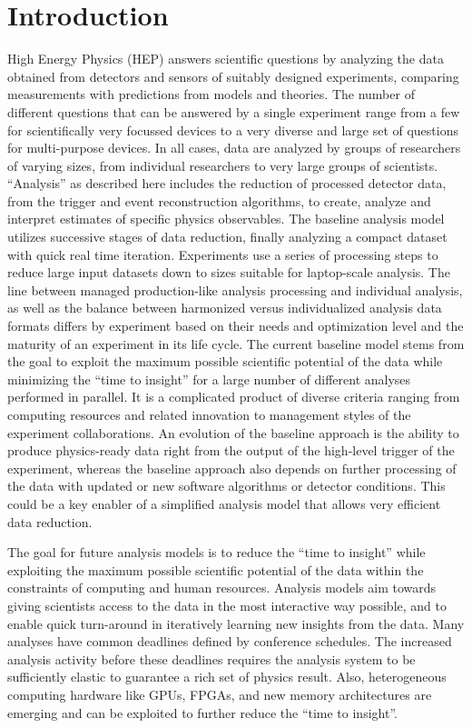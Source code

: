 \documentclass[12pt,a4paper]{article}
\begin{document}
\newpage

\section{Introduction}

High Energy Physics (HEP) answers scientific questions by analyzing the data obtained from detectors and sensors of suitably designed experiments, comparing measurements with predictions from models and theories. The number of different questions that can be answered by a single experiment range from a few for scientifically very focussed devices to a very diverse and large set of questions for multi-purpose devices. In all cases, data are analyzed by groups of researchers of varying sizes, from individual researchers to very large groups of scientists. ``Analysis'' as described here includes the reduction of processed detector data, from the trigger and event reconstruction algorithms, to create, analyze and interpret estimates of specific physics observables. The baseline analysis model utilizes successive stages of data reduction, finally analyzing a compact dataset with quick real time iteration. Experiments use a series of processing steps to reduce large input datasets down to sizes suitable for laptop-scale analysis. The line between managed production-like analysis processing and individual analysis, as well as the balance between harmonized versus individualized analysis data formats differs by experiment based on their needs and optimization level and the maturity of an experiment in its life cycle. The current baseline model stems from the goal to exploit the maximum possible scientific potential of the data while minimizing the ``time to insight'' for a large number of different analyses performed in parallel. It is a complicated product of diverse criteria ranging from computing resources and related innovation to management styles of the experiment collaborations. An evolution of the baseline approach is the ability to produce physics-ready data right from the output of the high-level trigger of the experiment, whereas the baseline approach also depends on further processing of the data with updated or new software algorithms or detector conditions. This could be a key enabler of a simplified analysis model that allows very efficient data reduction.

The goal for future analysis models is to reduce the ``time to insight'' while exploiting the maximum possible scientific potential of the data within the constraints of computing and human resources. Analysis models aim towards giving scientists access to the data in the most interactive way possible, and to enable quick turn-around in iteratively learning new insights from the data. Many analyses have common deadlines defined by conference schedules. The increased analysis activity before these deadlines requires the analysis system to be sufficiently elastic to guarantee a rich set of physics result. Also, heterogeneous computing hardware like GPUs, FPGAs, and new memory architectures are emerging and can be exploited to further reduce the ``time to insight''.
\end{document}
